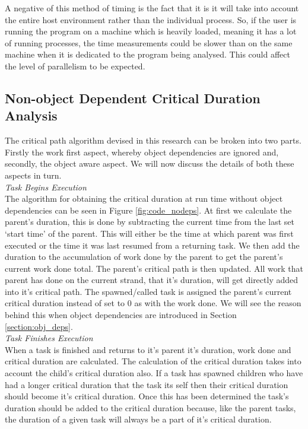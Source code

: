 A negative of this method of timing is the fact that it is it will take into account the entire host environment rather than the individual process. So, if the user is running the program on a machine which is heavily loaded, meaning it has a lot of running processes, the time measurements could be slower than on the same machine when it is dedicated to the program being analysed. This could affect the level of parallelism to be expected.

\subsection{Non-object Dependent Critical Duration Analysis}

The critical path algorithm devised in this research can be broken into two parts. Firstly the work first aspect, whereby object dependencies are ignored and, secondly, the object aware aspect. We will now discuss the details of both these aspects in turn.\\

\emph{Task Begins Execution}\\
The algorithm for obtaining the critical duration at run time without object dependencies can be seen in Figure \ref{fig:code_nodeps}. At first we calculate the parent's duration, this is done by subtracting the current time from the last set `start time' of the parent. This will either be the time at which parent was first executed or the time it was last resumed from a returning task. We then add the duration to the accumulation of work done by the parent to get the parent's current work done total. The parent's critical path is then updated. All work that parent has done on the current strand, that it's duration, will get directly added into it's critical path. The spawned/called task is assigned the parent's current critical duration instead of set to 0 as with the work done. We will see the reason behind this when object dependencies are introduced in Section \ref{section:obj_deps}.\\

\emph{Task Finishes Execution}\\
When a task is finished and returns to it's parent it's duration, work done and critical duration are calculated. The calculation of the critical duration takes into account the child's critical duration also. If a task has spawned children who have had a longer critical duration that the task its self then their critical duration should become it's critical duration. Once this has been determined the task's duration should be added to the critical duration because, like the parent tasks, the duration of a given task will always be a part of it's critical duration. 

